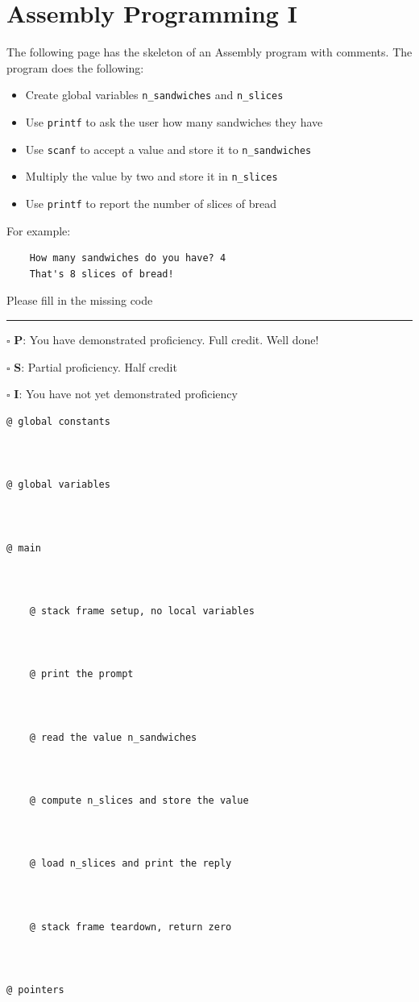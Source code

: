 \documentclass[12pt]{article}
\begin{document}


\section*{Assembly Programming I}

The following page has the skeleton of an Assembly program with comments. The program does the following:
\begin{itemize}
    \item Create global variables \texttt{n\_sandwiches} and \texttt{n\_slices}
    \item Use \texttt{printf} to ask the user how many sandwiches they have
    \item Use \texttt{scanf} to accept a value and store it to \texttt{n\_sandwiches}
    \item Multiply the value by two and store it in \texttt{n\_slices}
    \item Use \texttt{printf} to report the number of slices of bread
\end{itemize}

For example:
\begin{verbatim}
    How many sandwiches do you have? 4
    That's 8 slices of bread!
\end{verbatim}

Please fill in the missing code

\vfill

\rule[1ex]{\textwidth}{.1pt}

$\square$ \textbf{P}: You have demonstrated proficiency. Full credit. Well done!

$\square$ \textbf{S}: Partial proficiency. Half credit

$\square$ \textbf{I}: You have not yet demonstrated proficiency

\newpage

\begin{verbatim}
@ global constants



@ global variables



@ main


    
    @ stack frame setup, no local variables



    @ print the prompt



    @ read the value n_sandwiches



    @ compute n_slices and store the value



    @ load n_slices and print the reply



    @ stack frame teardown, return zero



@ pointers
\end{verbatim}
\end{document}
